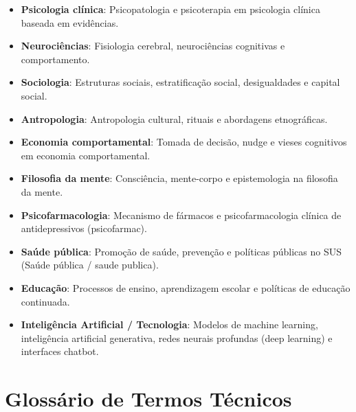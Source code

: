 \documentclass[12pt,a4paper,oneside]{abntex2}
\begin{document}
\begin{apendicesenv}
\begin{itemize}
    \item \textbf{Psicologia clínica}: Psicopatologia e psicoterapia em psicologia clínica baseada em evidências.

    \item \textbf{Neurociências}: Fisiologia cerebral, neurociências cognitivas e comportamento.

    \item \textbf{Sociologia}: Estruturas sociais, estratificação social, desigualdades e capital social.

    \item \textbf{Antropologia}: Antropologia cultural, rituais e abordagens etnográficas.

    \item \textbf{Economia comportamental}: Tomada de decisão, nudge e vieses cognitivos em economia comportamental.

    \item \textbf{Filosofia da mente}: Consciência, mente-corpo e epistemologia na filosofia da mente.

    \item \textbf{Psicofarmacologia}: Mecanismo de fármacos e psicofarmacologia clínica de antidepressivos (psicofarmac).

    \item \textbf{Saúde pública}: Promoção de saúde, prevenção e políticas públicas no SUS (Saúde pública / saude publica).

    \item \textbf{Educação}: Processos de ensino, aprendizagem escolar e políticas de educação continuada.

    \item \textbf{Inteligência Artificial / Tecnologia}: Modelos de machine learning, inteligência artificial generativa, redes neurais profundas (deep learning) e interfaces chatbot.
\end{itemize}


\chapter{Glossário de Termos Técnicos}


\end{apendicesenv}
\end{document}
